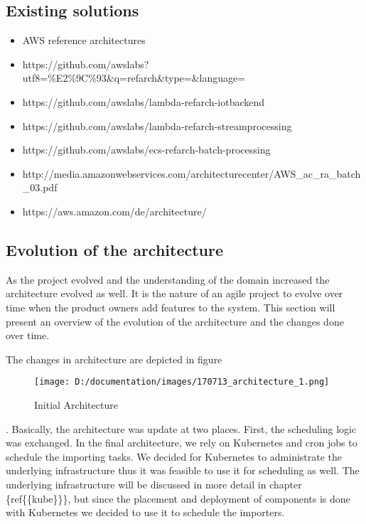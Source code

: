 \subsection{Existing solutions}\label{existing-solutions}

\begin{itemize}
\tightlist
\item
  AWS reference architectures
\item
  https://github.com/awslabs?utf8=\%E2\%9C\%93\&q=refarch\&type=\&language=
\item
  https://github.com/awslabs/lambda-refarch-iotbackend
\item
  https://github.com/awslabs/lambda-refarch-streamprocessing
\item
  https://github.com/awslabs/ecs-refarch-batch-processing
\item
  http://media.amazonwebservices.com/architecturecenter/AWS\_ac\_ra\_batch\_03.pdf
\item
  https://aws.amazon.com/de/architecture/
\end{itemize}

\subsection{Evolution of the
architecture}\label{evolution-of-the-architecture}

As the project evolved and the understanding of the domain increased the
architecture evolved as well. It is the nature of an agile project to
evolve over time when the product owners add features to the system.
This section will present an overview of the evolution of the
architecture and the changes done over time.

The changes in architecture are depicted in figure 
\begin{figure}
	\centering
		\texttt{[image: D:/documentation/images/170713\_architecture\_1.png]}
	\caption{Initial Architecture}
	\label{fig:170713_architecture_1}
\end{figure}
. Basically, the architecture was
update at two places. First, the scheduling logic was exchanged. In the
final architecture, we rely on Kubernetes and cron jobs to schedule the
importing tasks. We decided for Kubernetes to administrate the
underlying infrastructure thus it was feasible to use it for scheduling
as well. The underlying infrastructure will be discussed in more detail
in chapter \{ref\{\{kube\}\}\}, but since the placement and deployment
of components is done with Kubernetes we decided to use it to schedule
the importers.

